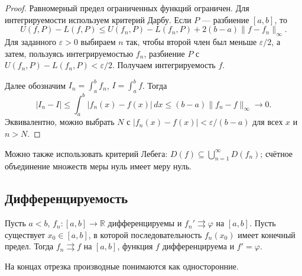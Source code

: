 \begin{proof}

Равномерный предел ограниченных функций ограничен. Для интегрируемости используем критерий Дарбу. Если \(P\) --- разбиение \([a,b]\), то \[
U(f,P)-L(f,P)
\le U(f_n,P)-L(f_n,P)+2(b-a)\lVert f-f_n\rVert_\infty.
\] Для заданного \(\varepsilon>0\) выбираем \(n\) так, чтобы второй член был меньше \(\varepsilon/2\), а затем, пользуясь интегрируемостью \(f_n\), разбиение \(P\) с \(U(f_n,P)-L(f_n,P)<\varepsilon/2\). Получаем интегрируемость \(f\).

Далее обозначим \(I_n=\int_a^b f_n\), \(I=\int_a^b f\). Тогда \[
|I_n-I|\le\int_a^b|f_n(x)-f(x)|\,dx
\le(b-a)\lVert f_n-f\rVert_\infty\longrightarrow0.
\] Эквивалентно, можно выбрать \(N\) с \(|f_n(x)-f(x)|<\varepsilon/(b-a)\) для всех \(x\) и \(n>N\).

\end{proof}

Можно также использовать критерий Лебега: \(D(f)\subseteq\bigcup_{n=1}^\infty D(f_n)\); счётное объединение множеств меры нуль имеет меру нуль.

\subsection{Дифференцируемость}\label{sec-sequences-02-6}

\begin{theorem}\label{thm-differentiate-sequence}

Пусть \(a<b\), \(f_n:[a,b]\to\mathbb R\) дифференцируемы и \(f_n'\rightrightarrows\varphi\) на \([a,b]\). Пусть существует \(x_0\in[a,b]\), в которой последовательность \(f_n(x_0)\) имеет конечный предел. Тогда \(f_n\rightrightarrows f\) на \([a,b]\), функция \(f\) дифференцируема и \(f'=\varphi\).

На концах отрезка производные понимаются как односторонние.

\end{theorem}

